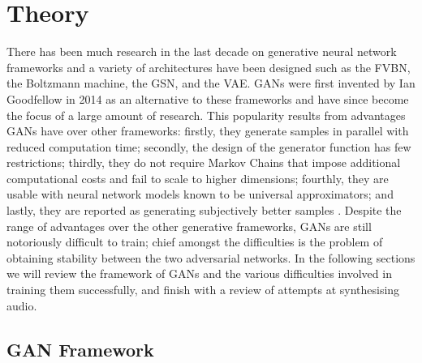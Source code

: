 \documentclass[a4paper, titlepage]{article}
\begin{document}
\newpage

\section{Theory}

There has been much research in the last decade on generative neural network frameworks and a variety of architectures have been designed such as the \ac{FVBN}, the Boltzmann machine, the \ac{GSN}, and the \ac{VAE}.
\ac{GAN}s were first invented by Ian Goodfellow in 2014 as an alternative to these frameworks and have since become the focus of a large amount of research.
\newline
\newline
This popularity results from advantages \ac{GAN}s have over other frameworks: firstly, they generate samples in parallel with reduced computation time; secondly, the design of the generator function has few restrictions; thirdly, they do not require Markov Chains that impose additional computational costs and fail to scale to higher dimensions; fourthly, they are usable with neural network models known to be universal approximators; and lastly, they are reported as generating subjectively better samples \citep{2017arXiv170100160G}.
\newline
\newline
Despite the range of advantages over the other generative frameworks, \ac{GAN}s are still notoriously difficult to train; chief amongst the difficulties is the problem of obtaining stability between the two adversarial networks.
In the following sections we will review the framework of \ac{GAN}s and the various difficulties involved in training them successfully, and finish with a review of attempts at synthesising audio.

\subsection{GAN Framework}
\end{document}
